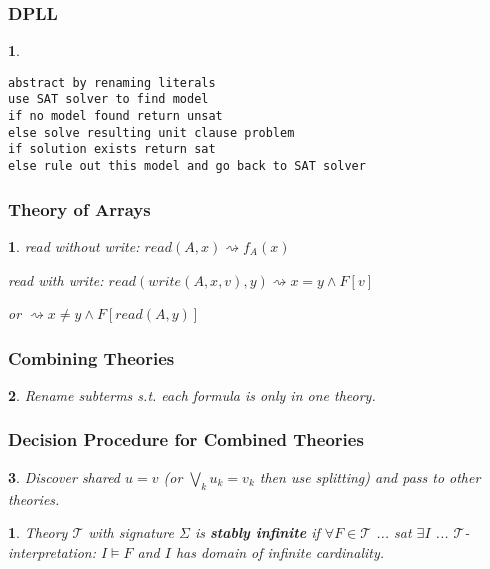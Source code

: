 \documentclass[]{article}
\newtheorem*{green}{}
\newtheorem*{red}{}
\newtheorem*{blue}{}
\begin{document}
\begin{multicols}{3}
\begin{minipage}[t]{.31\textwidth}
\subsubsection*{DPLL}
\begin{red}
\begin{verbatim}
abstract by renaming literals
use SAT solver to find model
if no model found return unsat
else solve resulting unit clause problem
if solution exists return sat
else rule out this model and go back to SAT solver
\end{verbatim}
\end{red}

\subsubsection*{Theory of Arrays}
\begin{blue}
read without write: $read(A,x) \rightsquigarrow f_A(x)$

read with write: $read(write(A,x,v),y) \rightsquigarrow x=y \land F[v]$

or \hspace{4cm} $\rightsquigarrow x\not= y \land F[read(A,y)]$
\end{blue}

\end{minipage}\hfil

\begin{minipage}[t]{.31\textwidth}

\subsubsection*{Combining Theories}
\begin{blue}
Rename subterms s.t. each formula is only in one theory.
\end{blue}

\subsubsection*{Decision Procedure for Combined Theories}
\begin{blue}
Discover shared $u=v$ (or $\bigvee_k u_k = v_k$ then use splitting) and pass to other theories.
\end{blue}

\begin{green}
Theory $\mathcal{T}$ with signature $\Sigma$ is \textbf{stably infinite} if $\forall F \in \mathcal{T}$ ... sat $\exists I$ ... $\mathcal{T}$-interpretation: $I \models F$ and $I$ has domain of infinite cardinality.


\end{green}
\end{minipage}
\end{multicols}
\end{document}
